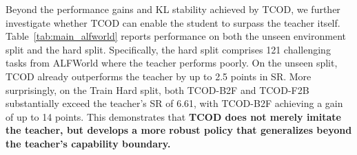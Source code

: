 \documentclass{article} %
\newcommand{\ours}{TCOD\xspace}
\begin{document}
Beyond the performance gains and KL stability achieved by \ours, 
we further investigate whether \ours can enable the student to surpass the teacher itself.
Table~\ref{tab:main_alfworld} reports performance on both the unseen environment split and the hard split.
Specifically, the hard split comprises 121 challenging tasks from ALFWorld where the teacher performs poorly.
On the unseen split, \ours already outperforms the teacher by up to 2.5 points in SR.
More surprisingly, on the Train Hard split, both \ours-B2F and \ours-F2B substantially exceed the teacher's SR of 6.61, with \ours-B2F achieving a gain of up to 14 points.
This demonstrates that \textbf{\ours does not merely imitate the teacher, but develops a more robust policy that generalizes beyond the teacher's capability boundary.}



\end{document}
